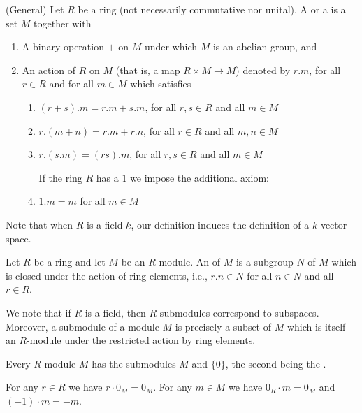 \documentclass[12pt, a4paper, twoside, openright, titlepage]{book}
\begin{document}
\begin{defn}{(General)}{}
    Let $R$ be a ring (not necessarily commutative nor unital). A  or a  is a set $M$ together with \begin{enumerate}
        \item A binary operation $+$ on $M$ under which $M$ is an abelian group, and
        \item An action of $R$ on $M$ (that is, a map $R\times M \rightarrow M$) denoted by $r.m$, for all $r \in R$ and for all $m \in M$ which satisfies \begin{enumerate}
                \item $(r+s).m = r.m + s.m$, for all $r,s \in R$ and all $m \in M$
                \item $r.(m+n) = r.m + r.n$, for all $r \in R$ and all $m,n \in M$
                \item $r.(s.m) = (rs).m$, for all $r,s \in R$ and all $m \in M$

                    \noindent If the ring $R$ has a $1$ we impose the additional axiom:
                \item $1.m = m$ for all $m \in M$
        \end{enumerate}
    \end{enumerate}
\end{defn}

Note that when $R$ is a field $k$, our definition induces the definition of a $k$-vector space.

\begin{defn}{}{}
    Let $R$ be a ring and let $M$ be an $R$-module. An  of $M$ is a subgroup $N$ of $M$ which is closed under the action of ring elements, i.e., $r.n \in N$ for all $n \in N$ and all $r \in R$.
\end{defn}

We note that if $R$ is a field, then $R$-submodules correspond to subspaces. Moreover, a submodule of a module $M$ is precisely a subset of $M$ which is itself an $R$-module under the restricted action by ring elements.

Every $R$-module $M$ has the submodules $M$ and $\{0\}$, the second being the .

\begin{lem}{}{}
    For any $r \in R$ we have $r \cdot 0_M = 0_M$. For any $m \in M$ we have $0_R\cdot m = 0_M$ and $(-1)\cdot m = -m$.
\end{lem}
\end{document}
